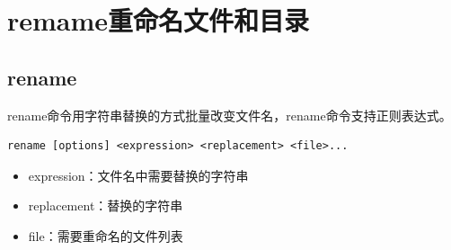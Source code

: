 \documentclass[12pt, openany, oneside]{book}
\begin{document}
\begin{table}[H]
	\centering
	\caption{mv参数说明}
\end{table}

\newpage

\section{remame重命名文件和目录}

\subsection{rename}

rename命令用字符串替换的方式批量改变文件名，rename命令支持正则表达式。

\vspace{-0.5cm}
\begin{lstlisting}
rename [options] <expression> <replacement> <file>...
\end{lstlisting}

\begin{itemize}
	\item expression：文件名中需要替换的字符串

	\item replacement：替换的字符串

	\item file：需要重命名的文件列表
\end{itemize}

\newpage
\end{document}

